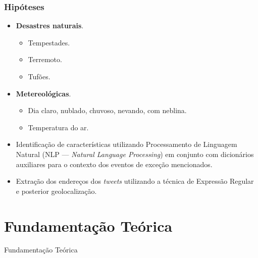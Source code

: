 \documentclass{beamer}
\begin{document}
\begin{frame}
\frametitle{Hipóteses}

\begin{itemize}
\item \textbf{Desastres naturais}.
\begin{itemize}
\item Tempestades.
\item Terremoto.
\item Tufões.
\end{itemize}

\item \textbf{Metereológicas}.
\begin{itemize}
\item Dia claro, nublado, chuvoso, nevando, com neblina.
\item Temperatura do ar.
\end{itemize}
\end{itemize}

\begin{itemize}

\item Identificação de características utilizando Processamento de Linguagem Natural (NLP --- \textit{Natural Language Processing}) em conjunto com dicionários auxiliares para o contexto dos eventos de exceção mencionados.

\item Extração dos endereços dos \textit{tweets} utilizando a técnica de Expressão Regular e posterior geolocalização.
\end{itemize}

\end{frame}
\section{Fundamentação Teórica}
\begin{frame}
\Huge{\centerline{Fundamentação Teórica}}
\end{frame}
\end{document}
